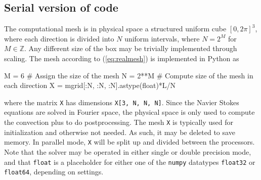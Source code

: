 \documentclass[11pt, oneside]{article}
\newcommand{\inpyth}{\lstinline[style=pythonstyle, basicstyle=\ttfamily]} %[]%
\begin{document}
\subsection{Serial version of code}
The computational mesh is in physical space a structured uniform cube $[0, 2\pi]^3$, where each direction is divided into $N$ uniform intervals, where $N=2^M$ for $M\in \mathbb{Z}$. Any different size of the box may be trivially implemented through scaling. The mesh according to (\ref{eq:realmesh}) is implemented in Python as
\begin{python}
M = 6     # Assign the size of the mesh
N = 2**M  # Compute size of the mesh in each direction
X = mgrid[:N, :N, :N].astype(float)*L/N
\end{python}
where the matrix \inpyth{X} has dimensions \inpyth{X[3, N, N, N]}. Since the Navier Stokes equations are solved in Fourier space, the physical space is only used to compute the convection plus to do postprocessing. The mesh \inpyth{X} is typically used for initialization and otherwise not needed. As such, it may be deleted to save memory. In parallel mode, \inpyth{X} will be split up and divided between the processors.  Note that the solver may be operated in either single or double precision mode, and that \inpyth{float} is a placeholder for either one of the \inpyth{numpy} datatypes \inpyth{float32} or \inpyth{float64}, depending on settings.
\end{document}
